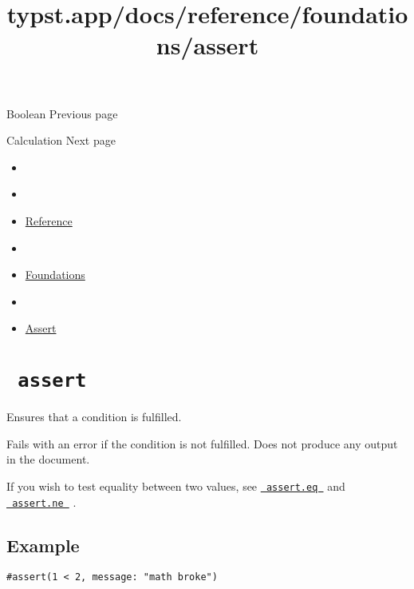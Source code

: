 \href{/docs/reference/foundations/bool/}{\pandocbounded{}}

{ Boolean } { Previous page }

\href{/docs/reference/foundations/calc/}{\pandocbounded{}}

{ Calculation } { Next page }


\title{typst.app/docs/reference/foundations/assert}

\begin{itemize}
\tightlist
\item
  \href{/docs}{}
\item
  
\item
  \href{/docs/reference/}{Reference}
\item
  
\item
  \href{/docs/reference/foundations/}{Foundations}
\item
  
\item
  \href{/docs/reference/foundations/assert/}{Assert}
\end{itemize}

\section{\texorpdfstring{\texttt{\ assert\ }}{ assert }}\label{summary}

Ensures that a condition is fulfilled.

Fails with an error if the condition is not fulfilled. Does not produce
any output in the document.

If you wish to test equality between two values, see
\href{/docs/reference/foundations/assert/\#definitions-eq}{\texttt{\ assert.eq\ }}
and
\href{/docs/reference/foundations/assert/\#definitions-ne}{\texttt{\ assert.ne\ }}
.

\subsection{Example}\label{example}

\begin{verbatim}
#assert(1 < 2, message: "math broke")
\end{verbatim}

